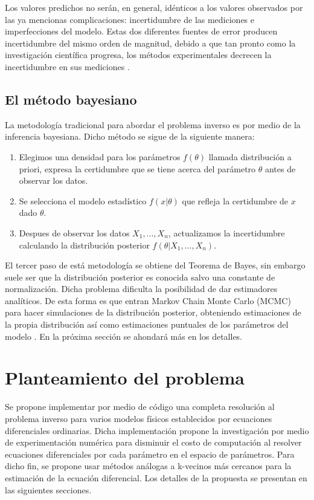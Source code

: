 \documentclass{article}
\begin{document}
Los valores predichos no serán, en general, idénticos a los valores observados por las ya mencionas complicaciones: incertidumbre de las mediciones e imperfecciones del modelo. Estas dos diferentes fuentes de error producen incertidumbre del mismo orden de magnitud, debido a que tan pronto como la investigación científica progresa, los métodos experimentales decrecen la incertidumbre en sus mediciones \cite{tarantola2005inverse}.

\subsection{El método bayesiano}    

La metodología tradicional para abordar el problema inverso es por medio de la inferencia bayesiana. Dicho método se sigue de la siguiente manera:
\begin{enumerate}
    \item Elegimos una densidad para los parámetros $f(\theta) $ llamada distribución a priori, expresa la certidumbre que se tiene acerca del parámetro $\theta$ antes de observar los datos.
    \item Se selecciona el modelo estadístico $f(x|\theta)$ que refleja la certidumbre de $x$ dado $\theta$.
    \item Despues de observar los datos $X_1,...,X_n$, actualizamos la incertidumbre calculando la distribución posterior $f(\theta|X_1,...,X_n)$.
\end{enumerate}

El tercer paso de está metodología se obtiene del Teorema de Bayes, sin embargo suele ser que la distribución posterior es conocida salvo una constante de normalización. Dicha problema dificulta la posibilidad de dar estimadores analíticos. De esta forma es que entran Markov Chain Monte Carlo (MCMC) para hacer simulaciones de la distribución posterior, obteniendo estimaciones de la propia distribución así como estimaciones puntuales de los parámetros del modelo \cite{wasserman2004all}. En la próxima sección se ahondará más en los detalles.


\section{Planteamiento del problema}    


Se propone implementar por medio de código una completa resolución al problema inverso para varios modelos físicos establecidos por ecuaciones diferenciales ordinarias. Dicha implementación propone la investigación por medio de experimentación numérica para disminuir el costo de computación al resolver ecuaciones diferenciales por cada parámetro en el espacio de parámetros. Para dicho fin, se propone usar métodos análogas a k-vecinos más cercanos para la estimación de la ecuación diferencial. Los detalles de la propuesta se presentan en las siguientes secciones.
\end{document}
